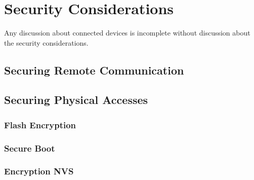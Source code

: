 \documentclass[main.tex]{subfiles}
\begin{document}
\chapter{Security Considerations}

Any discussion about connected devices is incomplete without discussion about the security considerations.

\section{Securing Remote Communication}



\section{Securing Physical Accesses}
\subsection{Flash Encryption}

\subsection{Secure Boot}
\subsection{Encryption NVS}
\end{document}
